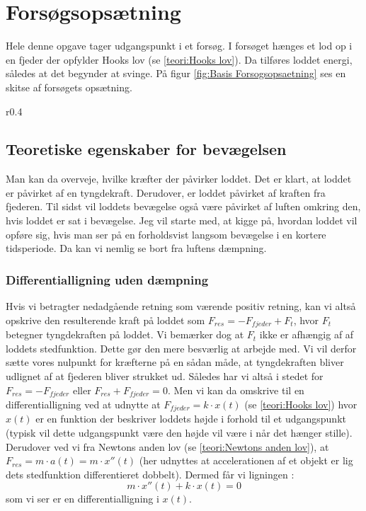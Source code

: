 \section{Forsøgsopsætning}\label{teori: opsatning af differentialligninger}
Hele denne opgave tager udgangspunkt i et forsøg.
I forsøget hænges et lod op i en fjeder der opfylder Hooks lov (se \ref{teori:Hooks lov}). 
Da tilføres loddet energi, således at det begynder at svinge. 
På figur \ref{fig:Basis Forsogsopsaetning} ses en skitse af forsøgets opsætning.

\begin{wrapfigure}{r}{0.4\textwidth}
\centering
{}%

\caption{Skitse af forsøgsopsætning.}
\label{fig:Basis Forsogsopsaetning}
\end{wrapfigure} 

\subsection{Teoretiske egenskaber for bevægelsen}
Man kan da overveje, hvilke kræfter der påvirker loddet. 
Det er klart, at loddet er påvirket af en tyngdekraft. 
Derudover, er loddet påvirket af kraften fra fjederen.
Til sidst vil loddets bevægelse også være påvirket af luften omkring den, hvis loddet er sat i bevægelse. 
Jeg vil starte med, at kigge på, hvordan loddet vil opføre sig, hvis man ser på en forholdsvist langsom bevægelse i en kortere tidsperiode.
Da kan vi nemlig se bort fra luftens dæmpning. 

\subsubsection{Differentialligning uden dæmpning}\label{teori: Opstilling ligning uden dampning}
Hvis vi betragter nedadgående retning som værende positiv retning, kan vi altså opskrive den resulterende kraft på loddet som $F_{res} = -F_{fjeder}+F_{t}$, hvor $F_t$ betegner tyngdekraften på loddet. 
Vi bemærker dog at $F_t$ ikke er afhængig af af loddets stedfunktion. 
Dette gør den mere besværlig at arbejde med. 
Vi vil derfor sætte vores nulpunkt for kræfterne på en sådan måde, at tyngdekraften bliver udlignet af at fjederen bliver strukket ud. 
Således har vi altså i stedet for $F_{res}=-F_{fjeder}$ eller $F_{res}+F_{fjeder}=0$.
Men vi kan da omskrive til en differentialligning ved at udnytte at $F_{fjeder}=k \cdot x(t)$ (se \ref{teori:Hooks lov}) hvor $x(t)$ er en funktion der beskriver loddets højde i forhold til et udgangspunkt (typisk vil dette udgangspunkt være den højde vil være i når det hænger stille).  
Derudover ved vi fra Newtons anden lov (se \ref{teori:Newtons anden lov}), at $F_{res}=m\cdot a(t) = m \cdot x''(t)$ 
(her udnyttes at accelerationen af et objekt er lig dets stedfunktion differentieret dobbelt). 
Dermed får vi ligningen :
$$m\cdot x''(t)+k\cdot x(t)=0$$ 
som vi ser er en differentialligning i $x(t)$.

